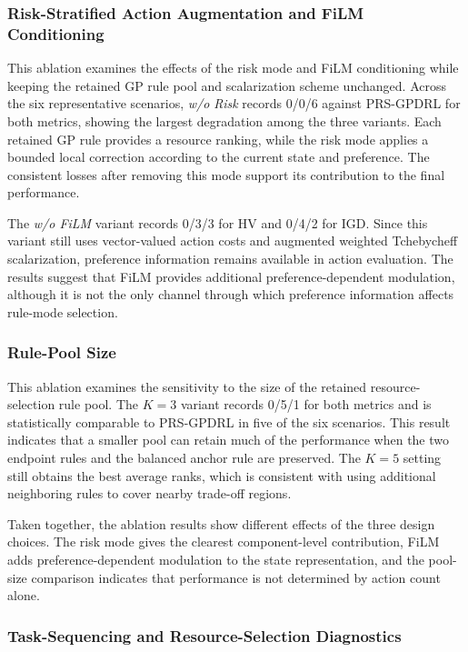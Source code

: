 \documentclass[10pt,journal]{IEEEtran}
\begin{document}
\subsubsection{Risk-Stratified Action Augmentation and FiLM Conditioning}

This ablation examines the effects of the risk mode and FiLM conditioning while keeping the retained GP rule pool and scalarization scheme unchanged. Across the six representative scenarios, \emph{w/o Risk} records 0/0/6 against PRS-GPDRL for both metrics, showing the largest degradation among the three variants. Each retained GP rule provides a resource ranking, while the risk mode applies a bounded local correction according to the current state and preference. The consistent losses after removing this mode support its contribution to the final performance.

The \emph{w/o FiLM} variant records 0/3/3 for HV and 0/4/2 for IGD. Since this variant still uses vector-valued action costs and augmented weighted Tchebycheff scalarization, preference information remains available in action evaluation. The results suggest that FiLM provides additional preference-dependent modulation, although it is not the only channel through which preference information affects rule-mode selection.

\subsubsection{Rule-Pool Size}

This ablation examines the sensitivity to the size of the retained resource-selection rule pool. The $K=3$ variant records 0/5/1 for both metrics and is statistically comparable to PRS-GPDRL in five of the six scenarios. This result indicates that a smaller pool can retain much of the performance when the two endpoint rules and the balanced anchor rule are preserved. The $K=5$ setting still obtains the best average ranks, which is consistent with using additional neighboring rules to cover nearby trade-off regions.

Taken together, the ablation results show different effects of the three design choices. The risk mode gives the clearest component-level contribution, FiLM adds preference-dependent modulation to the state representation, and the pool-size comparison indicates that performance is not determined by action count alone.



\subsubsection{Task-Sequencing and Resource-Selection Diagnostics}
\label{Sec: task sequencing design}
\end{document}
